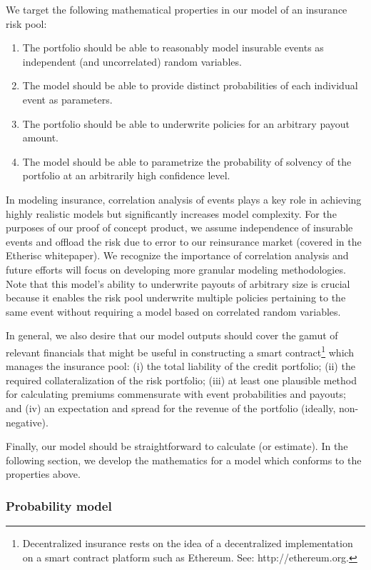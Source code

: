 \documentclass[12pt,a4paper]{article}
\begin{document}
We target the following mathematical properties in our model of an insurance risk pool:

\begin{enumerate}
\item The portfolio should be able to reasonably model insurable events as independent (and uncorrelated) random variables.
\item The model should be able to provide distinct probabilities of each individual event as parameters.
\item The portfolio should be able to underwrite policies for an arbitrary payout amount.
\item The model should be able to parametrize the probability of solvency of the portfolio at an arbitrarily high confidence level.  
\end{enumerate}

In modeling insurance, correlation analysis of events plays a key role in achieving highly realistic models but significantly increases model complexity. For the purposes of our proof of concept product, we assume independence of insurable events and offload the risk due to error to our reinsurance market (covered in the Etherisc whitepaper). We recognize the importance of correlation analysis and future efforts will focus on developing more granular modeling methodologies. Note that this model's ability to underwrite payouts of arbitrary size is crucial because it enables the risk pool underwrite multiple policies pertaining to the same event without requiring a model based on correlated random variables.

In general, we also desire that our model outputs should cover the gamut of relevant financials that might be useful in constructing a smart contract\footnote{Decentralized insurance rests on the idea of a decentralized implementation on a smart contract platform such as Ethereum. See: http://ethereum.org.} which manages the insurance pool: (i) the total liability of the credit portfolio; (ii) the required collateralization of the risk portfolio; (iii) at least one plausible method for calculating premiums commensurate with event probabilities and payouts; and (iv) an expectation and spread for the revenue of the portfolio (ideally, non-negative).

Finally, our model should be straightforward to calculate (or estimate). In the following section, we develop the mathematics for a model which conforms to the properties above.

\subsubsection{Probability model}
\end{document}
